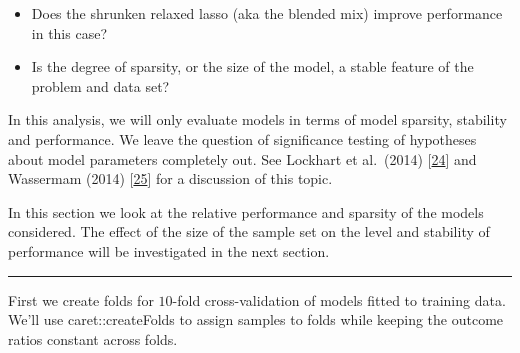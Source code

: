 \documentclass[
]{book}
\begin{document}
\begin{itemize}
\item
  Does the shrunken relaxed lasso (aka the blended mix) improve performance in this case?
\item
  Is the degree of sparsity, or the size of the model, a stable feature of the problem and data set?
\end{itemize}

In this analysis, we will only evaluate models in terms of
model sparsity, stability and performance. We leave the question
of significance testing of hypotheses about model parameters
completely out. See Lockhart et al.~(2014) {[}\protect\hyperlink{ref-Lockhart:2014aa}{24}{]}
and Wassermam (2014) {[}\protect\hyperlink{ref-Wasserman:2014aa}{25}{]} for a discussion of this topic.

In this section we look at the relative performance and sparsity of the models
considered. The effect of the size of the sample set on the level and
stability of performance will be investigated in the next section.

\begin{center}\rule{0.5\linewidth}{0.5pt}\end{center}

First we create folds for \(10\)-fold cross-validation of models fitted to
training data. We'll use caret::createFolds to assign samples
to folds while keeping the outcome ratios constant across folds.
\end{document}
